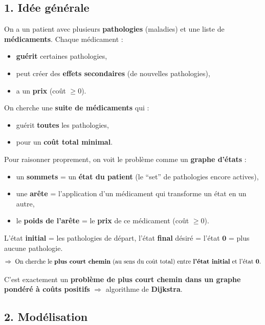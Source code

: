 
\subsection*{1. Idée générale}

On a un patient avec plusieurs \textbf{pathologies} (maladies) et une liste de \textbf{médicaments}. Chaque médicament : 
\begin{itemize}
    \item \textbf{guérit} certaines pathologies,
    \item peut créer des \textbf{effets secondaires} (de nouvelles pathologies),
    \item a un \textbf{prix} (coût $\ge 0$). \\
\end{itemize}

On cherche une \textbf{suite de médicaments} qui :
\begin{itemize}
    \item guérit \textbf{toutes} les pathologies,
    \item pour un \textbf{coût total minimal}. \\
\end{itemize}

Pour raisonner proprement, on voit le problème comme un \textbf{graphe d’états} :
\begin{itemize}
    \item un \textbf{sommets} = un \textbf{état du patient} (le “set” de pathologies encore actives),
    \item une \textbf{arête} = l’application d’un médicament qui transforme un état en un autre,
    \item le \textbf{poids de l’arête} = le \textbf{prix} de ce médicament (coût $\ge 0$).\\
\end{itemize}

L’état \textbf{initial} = les pathologies de départ, l’état \textbf{final} désiré = l’état \(\mathbf{0}\) = \og plus aucune pathologie\fg{}.
\[
\Rightarrow\ \text{On cherche le \textbf{plus court chemin} (au sens du coût total) entre \textbf{l’état initial} et l’état \textbf{0}}.
\]

C’est exactement un \textbf{problème de plus court chemin dans un graphe pondéré à coûts positifs} $\Rightarrow$ algorithme de \textbf{Dijkstra}.


\subsection*{2. Modélisation}

